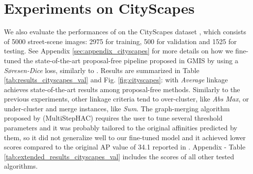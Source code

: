 \section{Experiments on CityScapes}\label{sec:cityscapes_exp}
We also evaluate the performances of \algname{} on the CityScapes dataset \cite{cordts2016cityscapes}, which consists of 5000 street-scene images: 2975 for training, 500 for validation and 1525 for testing.
See Appendix \ref{sec:appendix_cityscapes} for more details on how we fine-tuned the state-of-the-art proposal-free pipeline proposed in GMIS \cite{liu2018affinity} by using a \emph{S\o resen-Dice} loss, similarly to \cite{wolf2018mutex}.
Results are summarized in Table \ref{tab:results_cityscapes_val} and Fig. \ref{fig:cityscapes}: \algname{} with \emph{Average} linkage achieves state-of-the-art results among proposal-free methods.
 Similarly to the previous experiments, other linkage criteria tend to over-cluster, like \emph{Abs Max}, or under-cluster and merge instances, like \emph{Sum}. The graph-merging algorithm proposed by \cite{liu2018affinity} (MultiStepHAC) requires the user to tune several threshold parameters and it was probably tailored to the original affinities predicted by them, so it did not generalize well to our fine-tuned model and it achieved lower scores compared to the original AP value of 34.1 reported in \cite{liu2018affinity}.  
Appendix - Table \ref{tab:extended_results_cityscapes_val} includes the scores of all other tested \algname{} algorithms.
\captionsetup[subtable]{labelformat=simple, labelsep=space, justification=centering, singlelinecheck=off}
\renewcommand*{\thesubtable}{(\alph{subtable})}
